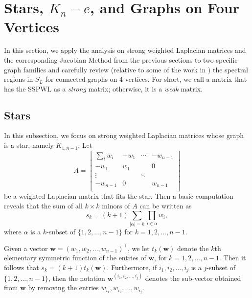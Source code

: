 \documentclass{article}
\theoremstyle{definition}
\newcommand{\trans}{^\top}
\newcommand{\bw}{\mathbf{w}}
\begin{document}
\section{Stars, \texorpdfstring{$K_n - e$}{Kn - e}, and Graphs on Four Vertices}
\label{sec:iepl4}

In this section, we apply the analysis on strong weighted Laplacian matrices and the corresponding Jacobian Method from the previous sections to two specific graph families and carefully review (relative to some of the work in \cite{IEPL})
the spectral regions in $S_{L}$  for connected graphs on 4 vertices.  For short, we call a matrix that has the SSPWL as a \emph{strong} matrix; otherwise, it is a \emph{weak} matrix.

\subsection{Stars}
 In this subsection, we focus on strong weighted Laplacian matrices whose graph is a star, namely $K_{1,n-1}$. 
Let
\[ A= \left[\begin{array}{c|ccc}
\sum_{i} w_i & -w_1 & \cdots & -w_{n-1} \\
\hline
-w_1 & w_1 & ~ & 0 \\
\vdots & ~ & \ddots & ~ \\
-w_{n-1} & 0 & ~ & w_{n-1}\\
\end{array} \right]
\]
be a weighted Laplacian matrix that fits the star. Then a basic computation reveals that the sum of all $k\times k$ minors of $A$ can be written as
\[ s_{k} = (k+1) \sum _{|\alpha|=k} \prod_{i \in \alpha} w_i, \]
where $\alpha$ is a $k$-subset of $\{1,2,\ldots, n-1\}$ for $k = 1,2,\ldots, n-1$.

Given a vector $\bw =(w_1, w_2, \ldots, w_{n-1})\trans$, we let 
$t_k(\bw)$ denote the $k$th elementary symmetric function of the entries of $\bw$, for $k=1,2,\ldots,n-1$. Then it follows that $s_k = (k+1)t_k(\bw)$. Furthermore, if $i_1, i_2, \ldots, i_j$ is a $j$-subset of $\{1,2,\ldots, n-1\}$, then the notation $\bw^{(i_1, i_2, \ldots, i_j)}$ denotes the sub-vector obtained from $\bw$ by removing the entries $w_{i_1}, w_{i_2}, \ldots, w_{i_j}$. 
\end{document}
